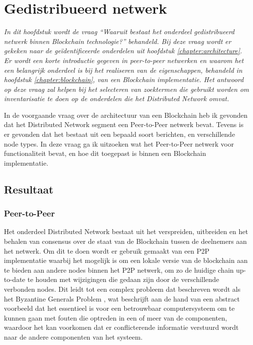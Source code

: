 \section{Gedistribueerd netwerk}

\textit{
  In dit hoofdstuk wordt de vraag ``Waaruit bestaat het onderdeel gedistribueerd netwerk binnen Blockchain technologie?'' behandeld. Bij deze vraag wordt er gekeken naar de geïdentificeerde onderdelen uit hoofdstuk \ref{chapter:architecture}. Er wordt een korte introductie gegeven in peer-to-peer netwerken en waarom het een belangrijk onderdeel is bij het realiseren van de eigenschappen, behandeld in hoofdstuk \ref{chapter:blockchain}, van een Blockchain implementatie. Het antwoord op deze vraag zal helpen bij het selecteren van zoektermen die gebruikt worden om inventarisatie te doen op de onderdelen die het Distributed Network omvat.
}

In de voorgaande vraag over de architectuur van een Blockchain heb ik gevonden dat het Distributed Network segment een Peer-to-Peer netwerk bevat. Tevens is er gevonden dat het bestaat uit een bepaald soort berichten, en verschillende node types. In deze vraag ga ik uitzoeken wat het Peer-to-Peer netwerk voor functionaliteit bevat, en hoe dit toegepast is binnen een Blockchain implementatie.

\subsection{Resultaat}

\subsubsection{Peer-to-Peer}

Het onderdeel Distributed Network bestaat uit het verspreiden, uitbreiden en het behalen van consensus over de staat van de Blockchain tussen de deelnemers aan het netwerk. Om dit te doen wordt er gebruik gemaakt van een \acrfull{P2P} implementatie waarbij het mogelijk is om een lokale versie van de blockchain aan te bieden aan andere nodes binnen het \acrshort{P2P} netwerk, om zo de huidige chain up-to-date te houden met wijzigingen die gedaan zijn door de verschillende verbonden nodes. Dit leidt tot een complex probleem dat beschreven wordt als het Byzantine Generals Problem \citep{lamport1982byzantine}, wat beschrijft aan de hand van een abstract voorbeeld dat het essentieel is voor een betrouwbaar computersysteem om te kunnen gaan met fouten die optreden in een of meer van de componenten, waardoor het kan voorkomen dat er conflicterende informatie verstuurd wordt naar de andere componenten van het systeem.

